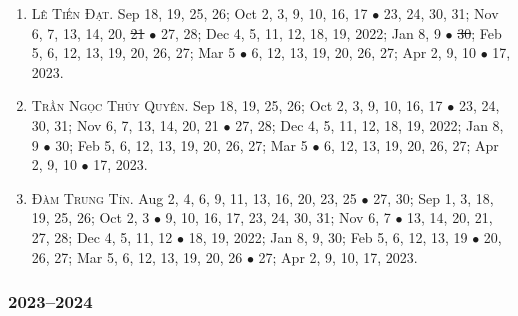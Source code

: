 \documentclass{article}
\begin{document}
\begin{enumerate}
	\item \textsc{Lê Tiến Đạt.} {\sf[In]} Sep 18, 19, 25, 26; Oct 2, 3, 9, 10, 16, 17 $\bullet$ 23, 24, 30, 31; Nov 6, 7, 13, 14, 20, \st{21} $\bullet$ 27, 28; Dec 4, 5, 11, 12, 18, 19, 2022; Jan 8, 9 $\bullet$ \st{30}; Feb 5, 6, 12, 13, 19, 20, 26, 27; Mar 5 $\bullet$ 6, 12, 13, 19, 20, 26, 27; Apr 2, 9, 10 $\bullet$ 17, 2023.
	\item \textsc{Trần Ngọc Thúy Quyên.} {\sf[In]} Sep 18, 19, 25, 26; Oct 2, 3, 9, 10, 16, 17 $\bullet$ 23, 24, 30, 31; Nov 6, 7, 13, 14, 20, 21 $\bullet$ 27, 28; Dec 4, 5, 11, 12, 18, 19, 2022; Jan 8, 9 $\bullet$ 30; Feb 5, 6, 12, 13, 19, 20, 26, 27; Mar 5 $\bullet$ 6, 12, 13, 19, 20, 26, 27; Apr 2, 9, 10 $\bullet$ 17, 2023.
	\item \textsc{Đàm Trung Tín.} {\sf[In]} Aug 2, 4, 6, 9, 11, 13, 16, 20, 23, 25 $\bullet$ 27, 30; Sep 1, 3, 18, 19, 25, 26; Oct 2, 3 $\bullet$ 9, 10, 16, 17, 23, 24, 30, 31; Nov 6, 7 $\bullet$ 13, 14, 20, 21, 27, 28; Dec 4, 5, 11, 12 $\bullet$ 18, 19, 2022; Jan 8, 9, 30; Feb 5, 6, 12, 13, 19 $\bullet$ 20, 26, 27; Mar 5, 6, 12, 13, 19, 20, 26 $\bullet$ 27; Apr 2, 9, 10, 17, 2023. {\sf[Out]}
\end{enumerate}

\subsubsection{2023--2024}
\end{document}
